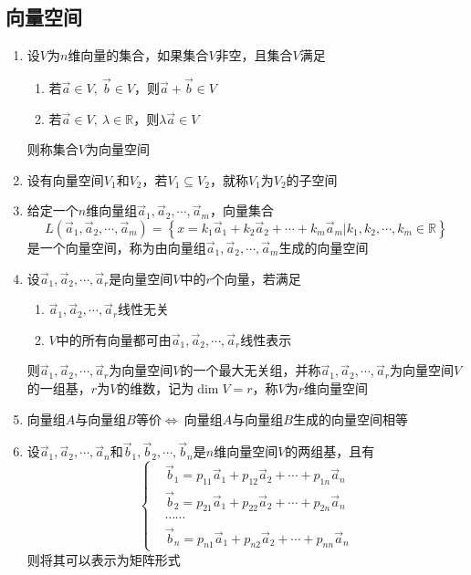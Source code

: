 \documentclass[12pt,a4paper,UTF8]{book}
\begin{document}
\subsection{向量空间}
\begin{enumerate}
\item 设$V$为$n$维向量的集合，如果集合$V$非空，且集合$V$满足
\begin{enumerate}
\item 若$\vec{a}\in V,\ \vec{b}\in V$，则$\vec{a}+\vec{b}\in V$
\item 若$\vec{a}\in V,\ \lambda\in \mathbb{R}$，则$\lambda\vec{a}\in V$
\end{enumerate}
则称集合$V$为向量空间
\item 设有向量空间$V_1$和$V_2$，若$V_1\subseteq V_2$，就称$V_1$为$V_2$的子空间
\item 给定一个$n$维向量组$\vec{a}_1,\vec{a}_2,\cdots,\vec{a}_m$，向量集合
\[L\left(\vec{a}_1,\vec{a}_2,\cdots,\vec{a}_m\right)=\left\{x=k_1\vec{a}_1+k_2\vec{a}_2+\cdots+k_m\vec{a}_m|k_1,k_2,\cdots,k_m\in \mathbb{R}\right\}\]
是一个向量空间，称为由向量组$\vec{a}_1,\vec{a}_2,\cdots,\vec{a}_m$生成的向量空间
\item 设$\vec{a}_1,\vec{a}_2,\cdots,\vec{a}_r$是向量空间$V$中的$r$个向量，若满足
\begin{enumerate}
\item $\vec{a}_1,\vec{a}_2,\cdots,\vec{a}_r$线性无关
\item $V$中的所有向量都可由$\vec{a}_1,\vec{a}_2,\cdots,\vec{a}_r$线性表示
\end{enumerate}
则$\vec{a}_1,\vec{a}_2,\cdots,\vec{a}_r$为向量空间$V$的一个最大无关组，并称$\vec{a}_1,\vec{a}_2,\cdots,\vec{a}_r$为向量空间$V$的一组基，$r$为$V$的维数，记为$\operatorname{dim}V=r$，称$V$为$r$维向量空间
\item $\text{向量组}A$与$\text{向量组}B$等价$\Longleftrightarrow\ $$\text{向量组}A$与$\text{向量组}B$生成的向量空间相等
\item 设$\vec{a}_1,\vec{a}_2,\cdots,\vec{a}_n$和$\vec{b}_1,\vec{b}_2,\cdots,\vec{b}_n$是$n$维向量空间$V$的两组基，且有
\[\left\{\begin{aligned}
&\vec{b}_1=p_{11}\vec{a}_1+p_{12}\vec{a}_2+\cdots+p_{1n}\vec{a}_n\\
&\vec{b}_2=p_{21}\vec{a}_1+p_{22}\vec{a}_2+\cdots+p_{2n}\vec{a}_n\\
&\cdots\cdots\\
&\vec{b}_n=p_{n1}\vec{a}_1+p_{n2}\vec{a}_2+\cdots+p_{nn}\vec{a}_n
\end{aligned}\right.\]
则将其可以表示为矩阵形式
$$
\end{enumerate}
\end{document}
